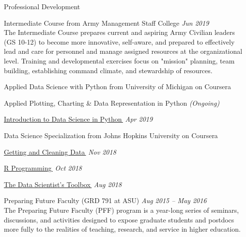 \begin{rBulletSection}{Professional Development}

\item Intermediate Course from Army Management Staff College \hfill \emph{Jun 2019}\\
    The Intermediate Course prepares current and aspiring Army Civilian leaders (GS 10-12) to become more innovative,
    self-aware, and prepared to effectively lead and care for personnel and manage assigned resources at the
    organizational level. Training and developmental exercises focus on "mission" planning, team building, establishing
    command climate, and stewardship of resources.

  \item Applied Data Science with Python from University of Michigan on Coursera

    \begin{rBulletList}

      \item Applied Plotting, Charting \& Data Representation in Python \hfill \emph{(Ongoing)}

      \item \href{https://www.coursera.org/account/accomplishments/certificate/UDBPYUJL4G5K}{Introduction to Data
        Science in Python\,} \hfill \emph{Apr 2019}


    \end{rBulletList}

  \item Data Science Specialization from Johns Hopkins University on Coursera

    \begin{rBulletList}

      \item \href{https://www.coursera.org/account/accomplishments/certificate/H8HZ695QZAV9}{Getting and Cleaning
        Data\,} \hfill \emph{Nov 2018}

      \item \href{https://www.coursera.org/account/accomplishments/certificate/742MSB39CNJN}{R Programming\,} \hfill
        \emph{Oct 2018}

      \item \href{https://www.coursera.org/account/accomplishments/certificate/EGS9V3KRQPP9}{The Data Scientist's
        Toolbox\,} \hfill \emph{Aug 2018}

    \end{rBulletList}


  \item Preparing Future Faculty (GRD 791 at ASU) \hfill \emph{Aug 2015 -- May 2016}\\
    The Preparing Future Faculty (PFF) program is a year-long series of seminars, discussions, and activities designed to expose graduate students and postdocs more fully to the realities of teaching, research, and service in higher education.

\end{rBulletSection}

